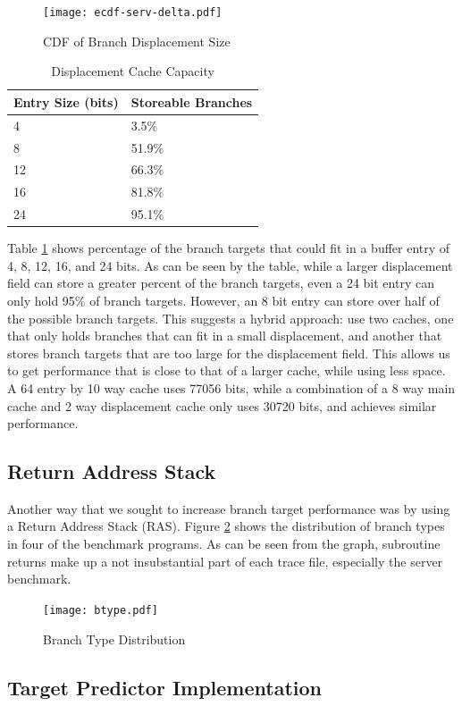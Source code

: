 \documentclass[twocolumn]{article}
\newcommand{\centerimage}[3]{
\begin{figure}[ht!]  
\begin{center}
#1
\caption{#2}
\label{#3}
\end{center}
\end{figure}}
\begin{document}
\centerimage{\texttt{[image: ecdf-serv-delta.pdf]}}{CDF
  of Branch Displacement Size}{ddelta}


\begin{table}\begin{center}\begin{tabular}{ll}

Entry Size (bits) & Storeable Branches \\
\hline
4 & 3.5\% \\
8 & 51.9\% \\
12 & 66.3\% \\
16 & 81.8\% \\
24 & 95.1\% 
\end{tabular}\end{center}
\caption{Displacement Cache Capacity}
\label{dtable}
\end{table}

Table \ref{dtable} shows percentage of the branch targets that could
fit in a buffer entry of 4, 8, 12, 16, and 24 bits. As can be seen by
the table, while a larger displacement field can store a greater
percent of the branch targets, even a 24 bit entry can only hold 95\%
of branch targets. However, an 8 bit entry can store over half of the
possible branch targets. This suggests a hybrid approach: use two
caches, one that only holds branches that can fit in a small
displacement, and another that stores branch targets that are too
large for the displacement field. This allows us to get performance
that is close to that of a larger cache, while using less space. A 64
entry by 10 way cache uses 77056 bits, while a combination of a 8 way
main cache and 2 way displacement cache only uses 30720 bits, and
achieves similar performance.

\subsection{Return Address Stack}
Another way that we sought to increase branch target performance was
by using a Return Address Stack (RAS). Figure \ref{btype} shows the
distribution of branch types in four of the benchmark programs. As can
be seen from the graph, subroutine returns make up a not insubstantial
part of each trace file, especially the server benchmark. 

\centerimage{\texttt{[image: btype.pdf]}}{Branch Type Distribution}{btype}


\subsection{Target Predictor Implementation}
\end{document}
